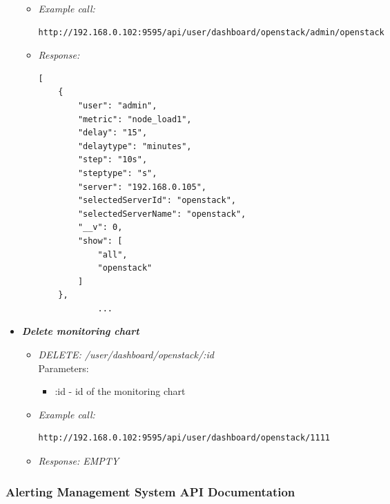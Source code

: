 \begin{itemize}
\begin{itemize}
\item \emph{Example call:}
 \begin{lstlisting}
http://192.168.0.102:9595/api/user/dashboard/openstack/admin/openstack
\end{lstlisting}

\item \emph{Response:}
 \begin{lstlisting}
[
    {
        "user": "admin",
        "metric": "node_load1",
        "delay": "15",
        "delaytype": "minutes",
        "step": "10s",
        "steptype": "s",
        "server": "192.168.0.105",
        "selectedServerId": "openstack",
        "selectedServerName": "openstack",
        "__v": 0,
        "show": [
            "all",
            "openstack"
        ]
    },
            ...
\end{lstlisting}
\end{itemize}


\item \textbf{\textit{Delete monitoring chart}}
\begin{itemize}
\item \emph{DELETE: /user/dashboard/openstack/:id}
\\Parameters:
\begin{itemize}
\item :id - id of the monitoring chart
\end{itemize}

\item \emph{Example call:}
 \begin{lstlisting}
http://192.168.0.102:9595/api/user/dashboard/openstack/1111
\end{lstlisting}

\item \emph{Response: EMPTY}
\end{itemize}


\end{itemize}



\subsubsection{Alerting Management System API Documentation}\label{Alerting Management System Documentation}


